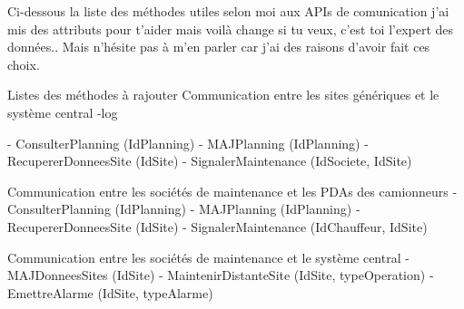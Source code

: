 Ci-dessous la liste des méthodes utiles selon moi aux APIs de comunication
j'ai mis des attributs pour t'aider mais voilà change si tu veux, c'est toi l'expert des données..
Mais n'hésite pas à m'en parler car j'ai des raisons d'avoir fait ces choix.

Listes des méthodes à rajouter
Communication entre les sites génériques et le système central
	-log
	
    - ConsulterPlanning (IdPlanning)
    - MAJPlanning (IdPlanning)
    - RecupererDonneesSite (IdSite)
    - SignalerMaintenance (IdSociete, IdSite)

Communication entre les sociétés de maintenance et les PDAs des camionneurs
    - ConsulterPlanning (IdPlanning)
    - MAJPlanning (IdPlanning)
    - RecupererDonneesSite (IdSite)
    - SignalerMaintenance (IdChauffeur, IdSite)

Communication entre les sociétés de maintenance et le système central
    - MAJDonneesSites (IdSite)
    - MaintenirDistanteSite (IdSite, typeOperation)
    - EmettreAlarme (IdSite, typeAlarme)


